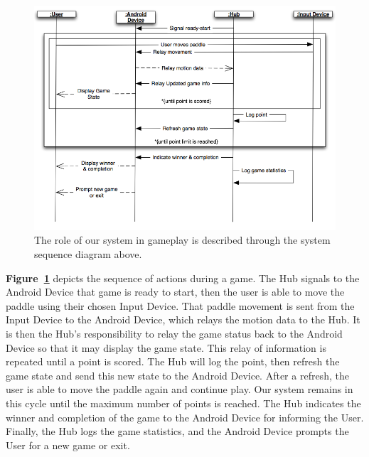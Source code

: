 \documentclass[12pt]{article}
\begin{document}
\begin{figure}
\begin{center}
\includegraphics[scale=.5]{ssd_GamePlay_1.png}
\caption{\label{ssd_GamePlay_1}The role of our system in gameplay is described through the system sequence diagram above.}
\end{center}
\end{figure}

\textbf{Figure~\ref{ssd_GamePlay_1}} depicts the sequence of actions during a game.  The Hub signals to the Android Device that game is ready to start, then the user is able to move the paddle using their chosen Input Device.  That paddle movement is sent from the Input Device to the Android Device, which relays the motion data to the Hub.  It is then the Hub's responsibility to relay the game status back to the Android Device so that it may display the game state.  This relay of information is repeated until a point is scored.  The Hub will log the point, then refresh the game state and send this new state to the Android Device.  After a refresh, the user is able to move the paddle again and continue play.  Our system remains in this cycle until the maximum number of points is reached.  The Hub indicates the winner and completion of the game to the Android Device for informing the User.  Finally, the Hub logs the game statistics, and the Android Device prompts the User for a new game or exit.
\end{document}
